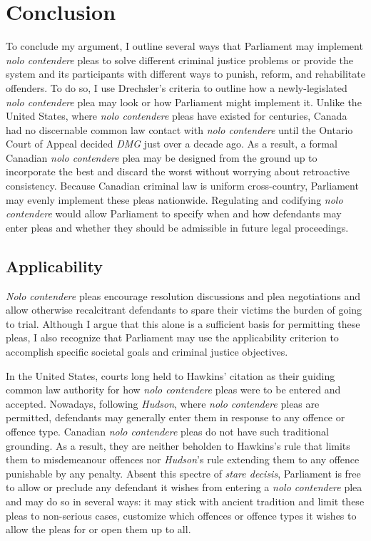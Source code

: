 \chapter{Conclusion}

\setcounter{footnote}{247}

To conclude my argument, I outline several ways that Parliament may implement \textit{nolo contendere} pleas to solve different criminal justice problems or provide the system and its participants with different ways to punish, reform, and rehabilitate offenders. To do so, I use Drechsler's criteria to outline how a newly-legislated \textit{nolo contendere} plea may look or how Parliament might implement it. Unlike the United States, where \textit{nolo contendere} pleas have existed for centuries, Canada had no discernable common law contact with \textit{nolo contendere} until the Ontario Court of Appeal decided \textit{DMG} just over a decade ago. As a result, a formal Canadian \textit{nolo contendere} plea may be designed from the ground up to incorporate the best and discard the worst without worrying about retroactive consistency. Because Canadian criminal law is uniform cross-country, Parliament may evenly implement these pleas nationwide. Regulating and codifying \textit{nolo contendere} would allow Parliament to specify when and how defendants may enter pleas and whether they should be admissible in future legal proceedings.

\section{Applicability}

\textit{Nolo contendere} pleas encourage resolution discussions and plea negotiations and allow otherwise recalcitrant defendants to spare their victims the burden of going to trial. Although I argue that this alone is a sufficient basis for permitting these pleas, I also recognize that Parliament may use the applicability criterion to accomplish specific societal goals and criminal justice objectives.

In the United States, courts long held to Hawkins' citation as their guiding common law authority for how \textit{nolo contendere} pleas were to be entered and accepted. Nowadays, following \textit{Hudson}, where \textit{nolo contendere} pleas are permitted, defendants may generally enter them in response to any offence or offence type. Canadian \textit{nolo contendere} pleas do not have such traditional grounding. As a result, they are neither beholden to Hawkins's rule that limits them to misdemeanour offences nor \textit{Hudson}'s rule extending them to any offence punishable by any penalty. Absent this spectre of \textit{stare decisis}, Parliament is free to allow or preclude any defendant it wishes from entering a \textit{nolo contendere} plea and may do so in several ways: it may stick with ancient tradition and limit these pleas to non-serious cases, customize which offences or offence types it wishes to allow the pleas for or open them up to all.

